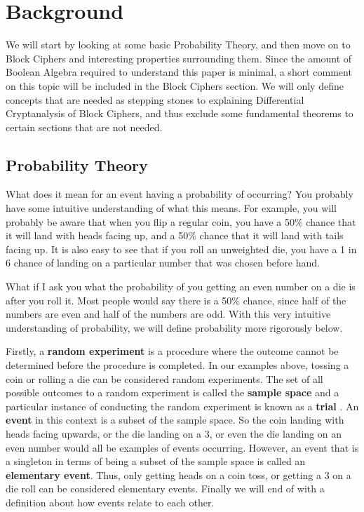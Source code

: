 



\chapter{Background} \label{c:background}

We will start by looking at some basic Probability Theory, and then move on to
Block Ciphers and interesting properties surrounding them.  Since the amount of
Boolean Algebra required to understand this paper is minimal, a short comment
on this topic will be included in the Block Ciphers section. We will only
define concepts that are needed as stepping stones to explaining Differential
Cryptanalysis of Block Ciphers, and thus exclude some fundamental theorems to
certain sections that are not needed. \cite{Alko}

\section{Probability Theory}

What does it mean for an event having a probability of occurring? You probably
have some intuitive understanding of what this means. For example, you will
probably be aware that when you flip a regular coin, you have a 50\% chance
that it will land with heads facing up, and a 50\% chance that it will land
with tails facing up. It is also easy to see that if you roll an unweighted
die, you have a 1 in 6 chance of landing on a particular number that was chosen
before hand.

What if I ask you what the probability of you getting an even number on a die
is after you roll it. Most people would say there is a 50\% chance, since half
of the numbers are even and half of the numbers are odd. With this very
intuitive understanding of probability, we will define probability more
rigorously below.

Firstly, a \textbf{random experiment} is a procedure where the outcome cannot
be determined before the procedure is completed. In our examples above, tossing
a coin or rolling a die can be considered random experiments.  The set of all
possible outcomes to a random experiment is called the \textbf{sample space}
and a particular instance of conducting the random experiment is known as a
\textbf{trial} \cite{IntroStat} . An \textbf{event} in this context is a
subset of the sample space. So the coin landing with heads facing upwards,
or the die landing on a 3, or even the die landing on an even number would all
be examples of events occurring. However, an event that is a singleton in terms
of being a subset of the sample space is called an \textbf{elementary event}.
Thus, only getting heads on a coin toss, or getting a 3 on a die roll can be
considered elementary events. Finally we will end of with a definition about
how events relate to each other.

